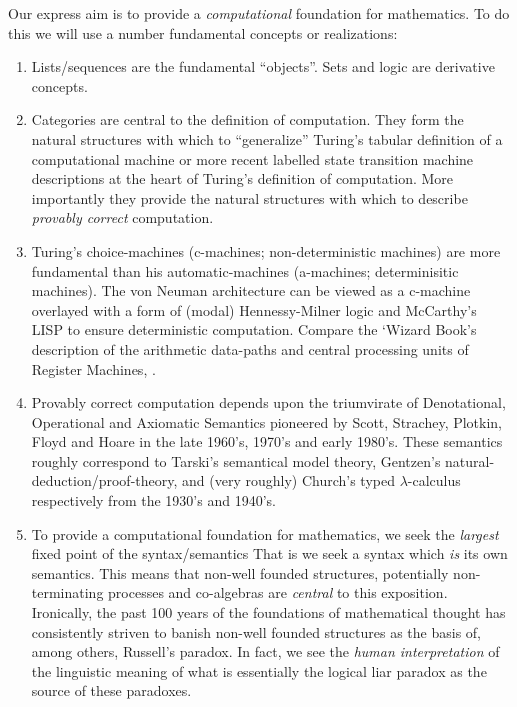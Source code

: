 
Our express aim is to provide a \emph{computational} foundation for mathematics.
To do this we will use a number fundamental concepts or realizations:
\begin{enumerate}
\item	Lists/sequences are the fundamental ``objects''. Sets and logic are
derivative concepts.

\item	Categories are central to the definition of computation. They form the
natural structures with which to ``generalize'' Turing's tabular definition of a
computational machine or more recent labelled state transition machine
descriptions at the heart of Turing's definition of computation. More
importantly they provide the natural structures with which to describe
\emph{provably correct} computation.

\item	Turing's choice-machines (c-machines; non-deterministic machines) are more
fundamental than his automatic-machines (a-machines; determinisitic machines).
The von Neuman architecture can be viewed as a c-machine overlayed with a form
of (modal) Hennessy-Milner logic and McCarthy's LISP to ensure deterministic
computation. Compare the `Wizard Book's description of the arithmetic data-paths
and central processing units of Register Machines, \cite[Chapter
5]{abelsonSussmanSussman1996structureInterpretationComputerPrograms}.

\item	Provably correct computation depends upon the triumvirate of Denotational,
Operational and Axiomatic Semantics pioneered by Scott, Strachey, Plotkin, Floyd
and Hoare in the late 1960's, 1970's and early 1980's. These semantics roughly
correspond to Tarski's semantical model theory, Gentzen's
natural-deduction/proof-theory, and (very roughly) Church's typed
$\lambda$-calculus respectively from the 1930's and 1940's.

\item	To provide a computational foundation for mathematics, we seek the
\emph{largest} fixed point of the syntax/semantics  That is we seek a syntax
which \emph{is} its own semantics. This means that non-well founded structures,
potentially non-terminating processes and co-algebras are \emph{central} to this
exposition. Ironically, the past 100 years of the foundations of mathematical
thought has consistently striven to banish non-well founded structures as the
basis of, among others, Russell's paradox. In fact, we see the \emph{human
interpretation} of the linguistic meaning of what is essentially the logical
liar paradox as the source of these paradoxes.


\end{enumerate}
